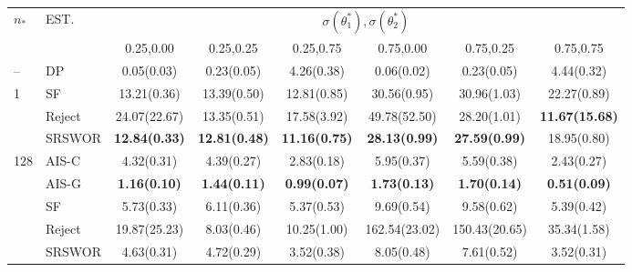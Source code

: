 \begin{tabular}{llcccccc}
  \toprule
  \multirow{2}{*}{$n_*$} & \multirow{2}{*}{EST.} & \multicolumn{6}{c}{$\sigma(\theta^*_1),\sigma(\theta^*_2)$} \\
  \cmidrule{3-8}
                         &                       & 0.25,0.00             & 0.25,0.25             & 0.25,0.75             & 0.75,0.00             & 0.75,0.25             & 0.75,0.75             \\
  \midrule
  \multirow{1}{*}{--}    & DP                    & {0.05(0.03)}          & {0.23(0.05)}          & {4.26(0.38)}          & {0.06(0.02)}          & {0.23(0.05)}          & {4.44(0.32)}          \\
  \midrule
  \multirow{3}{*}{1}     & SF                    & {13.21(0.36)}         & {13.39(0.50)}         & {12.81(0.85)}         & {30.56(0.95)}         & {30.96(1.03)}         & {22.27(0.89)}         \\
                         & Reject                & {24.07(22.67)}        & {13.35(0.51)}         & {17.58(3.92)}         & {49.78(52.50)}        & {28.20(1.01)}         & \textbf{11.67(15.68)} \\
                         & SRSWOR                & \textbf{12.84(0.33)}  & \textbf{12.81(0.48)}  & \textbf{11.16(0.75)}  & \textbf{28.13(0.99)}  & \textbf{27.59(0.99)}  & {18.95(0.80)}         \\
  \midrule
  \multirow{5}{*}{128}   & AIS-C                 & {4.32(0.31)}          & {4.39(0.27)}          & {2.83(0.18)}          & {5.95(0.37)}          & {5.59(0.38)}          & {2.43(0.27)}          \\
                         & AIS-G                 & \textbf{1.16(0.10)}   & \textbf{1.44(0.11)}   & \textbf{0.99(0.07)}   & \textbf{1.73(0.13)}   & \textbf{1.70(0.14)}   & \textbf{0.51(0.09)}   \\
                         & SF                    & {5.73(0.33)}          & {6.11(0.36)}          & {5.37(0.53)}          & {9.69(0.54)}          & {9.58(0.62)}          & {5.39(0.42)}          \\
                         & Reject                & {19.87(25.23)}        & {8.03(0.46)}          & {10.25(1.00)}         & {162.54(23.02)}       & {150.43(20.65)}       & {35.34(1.58)}         \\
                         & SRSWOR                & {4.63(0.31)}          & {4.72(0.29)}          & {3.52(0.38)}          & {8.05(0.48)}          & {7.61(0.52)}          & {3.52(0.31)}          \\

\end{tabular}
